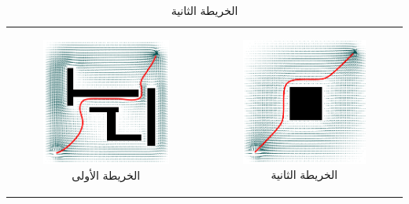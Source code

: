 
\begin{center}
	\centering
\begin{table}[ht]
	\begin{tabular}{cc}
		\begin{subfigure}{0.4\textwidth}\centering\includegraphics[width=0.9\linewidth]{figs/11/fig1}\caption{الخريطة الأولى}\label{11:fig:1}\end{subfigure}&
		\begin{subfigure}{0.4\textwidth}\centering\includegraphics[width=0.9\linewidth]{figs/11/fig2}\caption{الخريطة الثانية}\label{11:fig:2}\end{subfigure}\\

\end{tabular}
\end{table}
\end{center}
